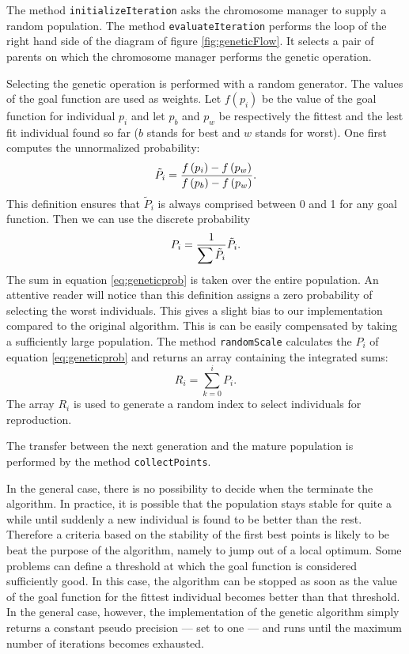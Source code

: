 \documentclass[twoside]{book}
\begin{document}
The method {\tt initializeIteration} asks the chromosome manager
to supply a random population. The method {\tt evaluateIteration}
performs the loop of the right hand side of the diagram of figure
\ref{fig:geneticFlow}. It selects a pair of parents on which the
chromosome manager performs the genetic operation.

Selecting the genetic operation is performed with a random
generator. The values of the goal function are used as weights.
Let $f\left(p_i\right)$ be the value of the goal function for
individual $p_i$ and let $p_b$ and $p_w$ be respectively the
fittest and the lest fit individual found so far ($b$ stands for
best and $w$ stands for worst). One first computes the
unnormalized probability:
\begin{equation}
  \tilde{P}_i={\displaystyle f\left(p_i\right) - f\left(p_w\right)
  \over\displaystyle f\left(p_b\right) - f\left(p_w\right)}.
\end{equation}
This definition ensures that $\tilde{P}_i$ is always comprised
between 0 and 1 for any goal function. Then we can use the
discrete probability
\begin{equation}
\label{eq:geneticprob}
  P_i={\displaystyle  1
  \over\displaystyle \sum\tilde{P}_i} \tilde{P}_i.
\end{equation}
The sum in equation \ref{eq:geneticprob} is taken over the entire
population. An attentive reader will notice than this definition
assigns a zero probability of selecting the worst individuals.
This gives a slight bias to our implementation compared to the
original algorithm. This is can be easily compensated by taking a
sufficiently large population. The method {\tt randomScale}
calculates the $P_i$ of equation \ref{eq:geneticprob} and returns
an array containing the integrated sums:
\begin{equation}
  R_i=\sum_{k=0}^i P_i.
\end{equation}
The array $R_i$ is used to generate a random index to select
individuals for reproduction.

\noindent The transfer between the next generation and the mature
population is performed by the method {\tt collectPoints}.

In the general case, there is no possibility to decide when the
terminate the algorithm. In practice, it is possible that the
population stays stable for quite a while until suddenly a new
individual is found to be better than the rest. Therefore a
criteria based on the stability of the first best points is likely
to be beat the purpose of the algorithm, namely to jump out of a
local optimum. Some problems can define a threshold at which the
goal function is considered sufficiently good. In this case, the
algorithm can be stopped as soon as the value of the goal function
for the fittest individual becomes better than that threshold. In
the general case, however, the implementation of the genetic
algorithm simply returns a constant pseudo precision
--- set to one --- and runs until the maximum number of iterations
becomes exhausted.
\end{document}
